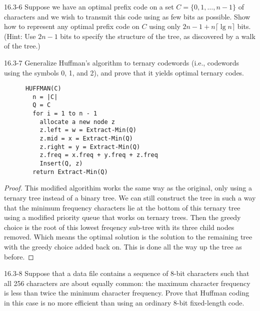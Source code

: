 





\homeworkheader{\classnameandsection}

\begin{problem}{16.3-6}
  Suppose we have an optimal prefix code on a set $C = \{0,1,\ldots,n-1\}$ of characters and we wish to transmit this
  code using as few bits as possible. Show how to represent any optimal prefix code on $C$ using only $2n - 1 + n \lceil
  \lg n \rceil$ bits. (Hint: Use $2n - 1$ bits to specify the structure of the tree, as discovered by a walk of the
  tree.)
\end{problem}

\begin{problem}{16.3-7}
  Generalize Huffman's algorithm to ternary codewords (i.e., codewords using the symbols 0, 1, and 2), and prove that it
  yields optimal ternary codes.
  \begin{solution}
    \begin{lstlisting}
      HUFFMAN(C)
        n = |C|
        Q = C
        for i = 1 to n - 1
          allocate a new node z
          z.left = w = Extract-Min(Q)
          z.mid = x = Extract-Min(Q)
          z.right = y = Extract-Min(Q)
          z.freq = x.freq + y.freq + z.freq
          Insert(Q, z)
        return Extract-Min(Q)
    \end{lstlisting}
    \begin{proof}
      This modified algorithim works the same way as the original, only using a ternary tree instead of a binary tree.
      We can still construct the tree in such a way that the minimum frequency characters lie at the bottom of this
      ternary tree using a modified priority queue that works on ternary trees. Then the greedy choice is the root of
      this lowest freqency sub-tree with its three child nodes removed. Which means the optimal solution is the solution
      to the remaining tree with the greedy choice added back on.  This is done all the way up the tree as before.
    \end{proof}
  \end{solution}
\end{problem}

\begin{problem}{16.3-8}
  Suppose that a data file contains a sequence of 8-bit characters such that all 256 characters are about equally
  common: the maximum character frequency is less than twice the minimum character frequency. Prove that Huffman coding
  in this case is no more efficient than using an ordinary 8-bit fixed-length code.
\end{problem}

